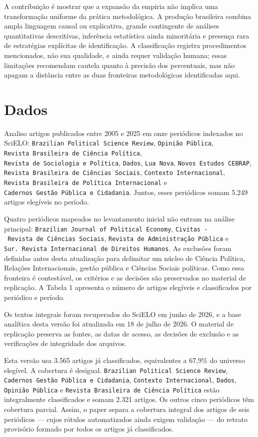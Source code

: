 \documentclass[
]{article}
\begin{document}
A contribuição é mostrar que a expansão da empiria não implica uma
transformação uniforme da prática metodológica. A produção brasileira
combina ampla linguagem causal ou explicativa, grande contingente de
análises quantitativas descritivas, inferência estatística ainda
minoritária e presença rara de estratégias explícitas de identificação.
A classificação registra procedimentos mencionados, não sua qualidade, e
ainda requer validação humana; essas limitações recomendam cautela
quanto à precisão dos percentuais, mas não apagam a distância entre as
duas fronteiras metodológicas identificadas aqui.

\section{Dados}\label{dados}

Analiso artigos publicados entre 2005 e 2025 em onze periódicos
indexados no SciELO: \texttt{Brazilian\ Political\ Science\ Review},
\texttt{Opinião\ Pública},
\texttt{Revista\ Brasileira\ de\ Ciência\ Política},
\texttt{Revista\ de\ Sociologia\ e\ Política}, \texttt{Dados},
\texttt{Lua\ Nova}, \texttt{Novos\ Estudos\ CEBRAP},
\texttt{Revista\ Brasileira\ de\ Ciências\ Sociais},
\texttt{Contexto\ Internacional},
\texttt{Revista\ Brasileira\ de\ Política\ Internacional} e
\texttt{Cadernos\ Gestão\ Pública\ e\ Cidadania}. Juntos, esses
periódicos somam 5.249 artigos elegíveis no período.

Quatro periódicos mapeados no levantamento inicial não entram na análise
principal: \texttt{Brazilian\ Journal\ of\ Political\ Economy},
\texttt{Civitas\ -\ Revista\ de\ Ciências\ Sociais},
\texttt{Revista\ de\ Administração\ Pública} e
\texttt{Sur.\ Revista\ Internacional\ de\ Direitos\ Humanos}. As
exclusões foram definidas antes desta atualização para delimitar um
núcleo de Ciência Política, Relações Internacionais, gestão pública e
Ciências Sociais políticas. Como essa fronteira é contestável, os
critérios e as decisões são preservados no material de replicação. A
Tabela 1 apresenta o número de artigos elegíveis e classificados por
periódico e período.

Os textos integrais foram recuperados do SciELO em junho de 2026, e a
base analítica desta versão foi atualizada em 18 de julho de 2026. O
material de replicação preserva as fontes, as datas de acesso, as
decisões de exclusão e as verificações de integridade dos arquivos.

Esta versão usa 3.565 artigos já classificados, equivalentes a 67,9\% do
universo elegível. A cobertura é desigual.
\texttt{Brazilian\ Political\ Science\ Review},
\texttt{Cadernos\ Gestão\ Pública\ e\ Cidadania},
\texttt{Contexto\ Internacional}, \texttt{Dados},
\texttt{Opinião\ Pública} e
\texttt{Revista\ Brasileira\ de\ Ciência\ Política} estão integralmente
classificados e somam 2.321 artigos. Os outros cinco periódicos têm
cobertura parcial. Assim, o paper separa a cobertura integral dos
artigos de seis periódicos --- cujos rótulos automatizados ainda exigem
validação --- do retrato provisório formado por todos os artigos já
classificados.
\end{document}
